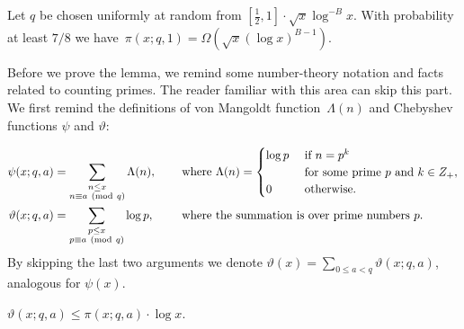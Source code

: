\begin{lemma}\label{le:many_p_equal_1_mod_q}
 Let $q$ be chosen uniformly at random from $[\frac12,1]\cdot \sqrt{x}\log^{-B} x$.
 With probability at least $7/8$ we have~$\pi(x;q,1) = \Omega(\sqrt{x}(\log x)^{B-1})$.
\end{lemma}

Before we prove the lemma, we remind some number-theory notation and facts related to counting primes. 
The reader familiar with this area can skip this part.
We first remind the definitions of von Mangoldt function~$\Lambda(n)$ and Chebyshev functions $\psi$ and $\vartheta$:

\begin{align*}
\psi(x;q,a) &= \sum_{\substack{n\leq x\\ n\equiv a \ (\mathrm{mod}\ q)}} \Lambda(n), \quad &\text{ where } &\Lambda(n) = \begin{cases} \log p  &\text{ if } n=p^{k} \\ & \mbox{ for some prime } p \mbox{ and } k \in Z_+, \\  0 &\text{ otherwise. } \end{cases} \\ 
\vartheta(x;q,a) &= \sum_{\substack{p\leq x \\ p \equiv a\ (\mathrm{mod}\ q)}} \log p, \quad &\text{ where } &\text{the summation is over prime numbers $p$.
}
\end{align*}
\noindent
By skipping the last two arguments we denote $\vartheta(x) = \sum_{0\leq a<q} \vartheta(x;q,a)$, analogous for $\psi(x)$.

\begin{fact}[By definition]\label{fa:vartheta_pi}
 $ \vartheta(x;q,a) \leq  \pi(x;q,a)\cdot\log x$.
\end{fact}

